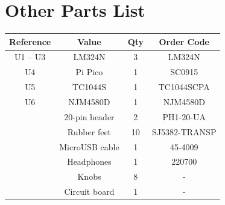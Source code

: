 \section{Other Parts List}
\label{sec:otherpartslist}

\def\arraystretch{2}
\begin{tabular}{cccc}
\hline
\textbf{Reference}               & \textbf{Value}    & \textbf{Qty} & \textbf{Order Code} \\ \hline
U1 – U3                          & LM324N            & 3            & LM324N              \\ \hline
U4                               & Pi Pico           & 1            & SC0915              \\ \hline
U5                               & TC1044S           & 1            & TC1044SCPA          \\ \hline
U6                               & NJM4580D          & 1            & NJM4580D            \\ \hline
                                 & 20-pin header     & 2            & PH1-20-UA           \\ \hline
                                 & Rubber feet       & 10           & SJ5382-TRANSP       \\ \hline
                                 & MicroUSB cable    & 1            & 45-4009             \\ \hline
                                 & Headphones        & 1            & 220700              \\ \hline
                                 & Knobs             & 8            & -                   \\ \hline
                                 & Circuit board     & 1            & -                   \\ \hline
\end{tabular}



